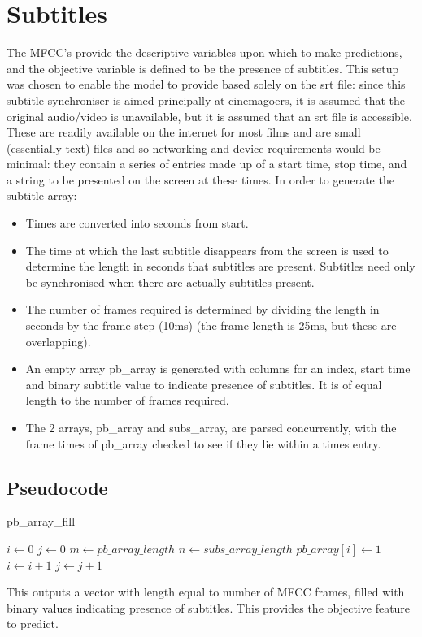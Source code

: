 \section{Subtitles}
The MFCC’s provide the descriptive variables upon which to make predictions, and the objective variable is defined to be the presence of subtitles. This setup was chosen to enable the model to provide based solely on the srt file: since this subtitle synchroniser is aimed principally at cinemagoers, it is assumed that the original audio/video is unavailable, but it is assumed that an srt file is accessible. These are readily available on the internet for most films and are small (essentially text) files and so networking and device requirements would be minimal: they contain a series of entries made up of a start time, stop time, and a string to be presented on the screen at these times. In order to generate the subtitle array:
\begin{itemize}
	\item Times are converted into seconds from start.
	\item The time at which the last subtitle disappears from the screen is used to determine the length in seconds that subtitles are present. Subtitles need only be synchronised when there are actually subtitles present.
	\item The number of frames required is determined by dividing the length in seconds by the frame step (10ms) (the frame length is 25ms, but these are overlapping).
	\item An empty array pb\_array is generated with columns for an index, start time and binary subtitle value to indicate presence of subtitles. It is of equal length to the number of frames required.
	\item The 2 arrays, pb\_array and subs\_array, are parsed concurrently, with the frame times of pb\_array checked to see if they lie within a times entry.
\end{itemize}

\subsection{Pseudocode}
\begin{algorithm}
	\caption{pb\_array\_fill}\label{euclid}
	\begin{algorithmic}[1]
		\State $i \gets 0$
		\State $j \gets 0$
		\State $m \gets pb\_array\_length$
		\State $n \gets subs\_array\_length$
			\BREAK
			\EndIf
			\BREAK
			\EndIf
				\State $pb\_array[i] \gets 1$
				\State $i \gets i+1$
				\EndIf
			\Else
				\State $j \gets j+1$
			\EndIf
		\EndIf
		\EndProcedure
	\end{algorithmic}
\end{algorithm}

This outputs a vector with length equal to number of MFCC frames, filled with binary values indicating presence of subtitles. This provides the objective feature to predict.


